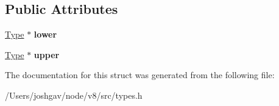\subsection*{Public Attributes}
\begin{DoxyCompactItemize}
\item 
\hyperlink{classv8_1_1internal_1_1_type}{Type} $\ast$ {\bfseries lower}\hypertarget{structv8_1_1internal_1_1_bounds_a4fa10b590f09f30fc9ff993668e21691}{}\label{structv8_1_1internal_1_1_bounds_a4fa10b590f09f30fc9ff993668e21691}

\item 
\hyperlink{classv8_1_1internal_1_1_type}{Type} $\ast$ {\bfseries upper}\hypertarget{structv8_1_1internal_1_1_bounds_ae5e09daa3fe062282b4153da14ffab58}{}\label{structv8_1_1internal_1_1_bounds_ae5e09daa3fe062282b4153da14ffab58}

\end{DoxyCompactItemize}


The documentation for this struct was generated from the following file\+:\begin{DoxyCompactItemize}
\item 
/\+Users/joshgav/node/v8/src/types.\+h\end{DoxyCompactItemize}
